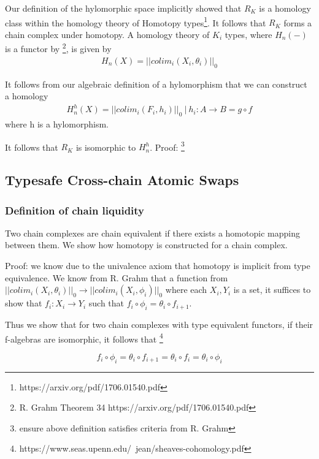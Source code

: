 \documentclass{article}
\begin{document}
Our definition of the hylomorphic space implicitly showed that $R_K$ is a homology class within the homology theory of Homotopy types\footnote{https://arxiv.org/pdf/1706.01540.pdf}. It follows that $R_K$ forms a chain complex under homotopy. A homology theory of $K_i$ types, where $H_n(-)$ is a functor by \footnote{R. Grahm Theorem 34 https://arxiv.org/pdf/1706.01540.pdf}, is given by 
\begin{equation} \label{eq1}
\begin{split}
H_n(X) = || colim_i (X_i,\theta_i) ||_0
\end{split}
\end{equation}

It follows from our algebraic definition of a hylomorphism that we can construct a homology
\begin{equation} \label{eq1}
\begin{split}
H^{h}_n(X) = || colim_i (F_i, h_i) ||_0 \ | \ h_i: A \rightarrow B = g \circ f
\end{split}
\end{equation}
where h is a hylomorphism.

It follows that $R_K$ is isomorphic to $H^{h}_n$. Proof: \footnote{ensure above definition satisfies criteria from R. Grahm}

\subsection{Typesafe Cross-chain Atomic Swaps}
\subsubsection{Definition of chain liquidity}
Two chain complexes are chain equivalent if there exists a homotopic mapping between them. We show how homotopy is constructed for a chain complex.

Proof: we know due to the univalence axiom that homotopy is implicit from type equivalence. We know from R. Grahm that a function from $|| colim_i (X_i,\theta_i) ||_0 \rightarrow || colim_i (X_i,\phi_i) ||_0$ where each $ X_i,Y_i $ is a set, it suffices to show that $f_i: X_i  \rightarrow Y_i$ such that $ f_i \circ \phi_i =  \theta_i \circ f_{i+1}$.

Thus we show that for two chain complexes with type equivalent functors, if their f-algebras are isomorphic, it follows that \footnote{https://www.seas.upenn.edu/~jean/sheaves-cohomology.pdf}

\begin{equation}
f_i \circ \phi_i =  \theta_i \circ f_{i+1} = \theta_i \circ f_i =  \theta_i \circ \phi_i
\end{equation}
\end{document}

